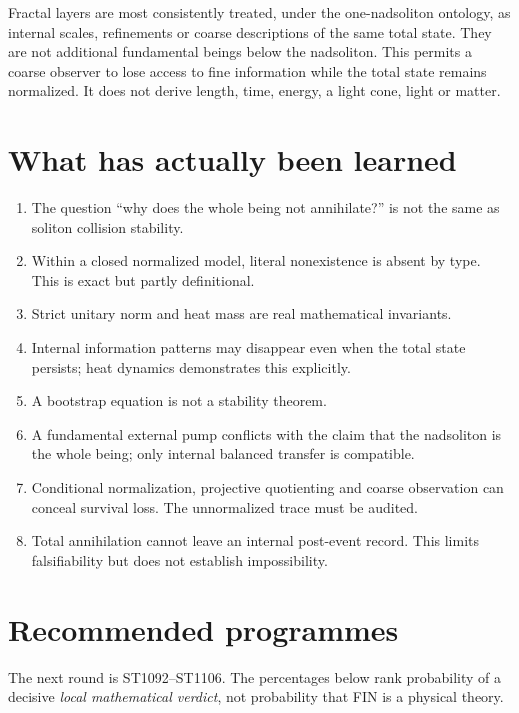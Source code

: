 \documentclass[11pt,a4paper]{article}
\begin{document}
Fractal layers are most consistently treated, under the one-nadsoliton
ontology, as internal scales, refinements or coarse descriptions of the same
total state.  They are not additional fundamental beings below the
nadsoliton.  This permits a coarse observer to lose access to fine information
while the total state remains normalized.  It does not derive length, time,
energy, a light cone, light or matter.

\section{What has actually been learned}

\begin{enumerate}
\item The question ``why does the whole being not annihilate?'' is not the
      same as soliton collision stability.
\item Within a closed normalized model, literal nonexistence is absent by
      type.  This is exact but partly definitional.
\item Strict unitary norm and heat mass are real mathematical invariants.
\item Internal information patterns may disappear even when the total state
      persists; heat dynamics demonstrates this explicitly.
\item A bootstrap equation is not a stability theorem.
\item A fundamental external pump conflicts with the claim that the
      nadsoliton is the whole being; only internal balanced transfer is
      compatible.
\item Conditional normalization, projective quotienting and coarse observation
      can conceal survival loss.  The unnormalized trace must be audited.
\item Total annihilation cannot leave an internal post-event record.  This
      limits falsifiability but does not establish impossibility.
\end{enumerate}

\section{Recommended programmes}

The next round is ST1092--ST1106.  The percentages below rank probability of a
decisive \emph{local mathematical verdict}, not probability that FIN is a
physical theory.
\end{document}
